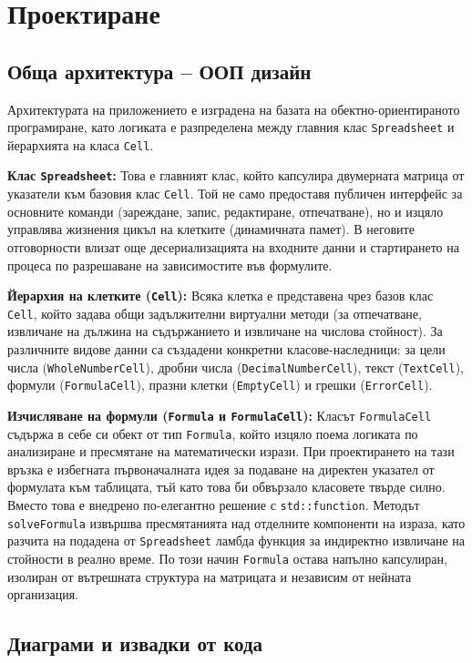 \chapter{Проектиране}

\section{Обща архитектура – ООП дизайн}
Архитектурата на приложението е изградена на базата на обектно-ориентираното програмиране, като логиката е разпределена между главния
клас \texttt{Spreadsheet} и йерархията на класа \texttt{Cell}.

\textbf{Клас \texttt{Spreadsheet}:}
Това е главният клас, който капсулира двумерната матрица от указатели към базовия клас \texttt{Cell}. Той не само предоставя публичен
интерфейс за основните команди (зареждане, запис, редактиране, отпечатване), но и изцяло управлява жизнения цикъл на клетките
(динамичната памет). В неговите отговорности влизат още десериализацията на входните данни и стартирането на процеса по разрешаване
на зависимостите във формулите.

\textbf{Йерархия на клетките (\texttt{Cell}):}
Всяка клетка е представена чрез базов клас \texttt{Cell}, който задава общи задължителни виртуални методи (за отпечатване, извличане
на дължина на съдържанието и извличане на числова стойност). За различните видове данни са създадени конкретни класове-наследници:
за цели числа (\texttt{WholeNumberCell}), дробни числа (\texttt{DecimalNumberCell}), текст (\texttt{TextCell}), формули
(\texttt{FormulaCell}), празни клетки (\texttt{EmptyCell}) и грешки (\texttt{ErrorCell}).

\textbf{Изчисляване на формули (\texttt{Formula} и \texttt{FormulaCell}):}
Класът \texttt{FormulaCell} съдържа в себе си обект от тип \texttt{Formula}, който изцяло поема логиката по анализиране и
пресмятане на математически изрази. При проектирането на тази връзка е избегната първоначалната идея за подаване на директен
указател от формулата към таблицата, тъй като това би обвързало класовете твърде силно. Вместо това е внедрено по-елегантно
решение с \texttt{std::function}. Методът \texttt{solveFormula} извършва пресмятанията над отделните компоненти на израза,
като разчита на подадена от \texttt{Spreadsheet} ламбда функция за индиректно извличане на стойности в реално време. По този
начин \texttt{Formula} остава напълно капсулиран, изолиран от вътрешната структура на матрицата и независим от нейната организация.

\section{Диаграми и извадки от кода}

